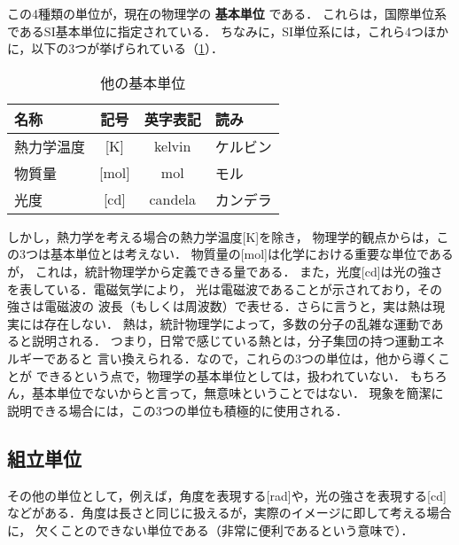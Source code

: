             この4種類の単位が，現在の物理学の \textbf{基本単位} である．
            これらは，国際単位系であるSI基本単位に指定されている．
            ちなみに，SI単位系には，これら4つほかに，以下の3つが挙げられている（\Table\ref{table:o4unit}）．
                \begin{table}[htb]
                  \centering
                  \caption{他の基本単位}
                  \begin{tabular}{|l|c|c|l|}                      \hline
                    名称       & 記号   & 英字表記 & 読み      \\ \hline \hline
                    熱力学温度 & [K]    & kelvin   & ケルビン  \\ \hline
                    物質量     & [mol]  & mol      & モル      \\ \hline
                    光度       & [cd]   & candela  & カンデラ  \\ \hline
                  \end{tabular}
                  \label{table:o4unit}
                \end{table}

            しかし，熱力学を考える場合の熱力学温度[K]を除き，
            物理学的観点からは，この3つは基本単位とは考えない．
            物質量の[mol]は化学における重要な単位であるが，
            これは，統計物理学から定義できる量である．
            また，光度[cd]は光の強さを表している．電磁気学により，
            光は電磁波であることが示されており，その強さは電磁波の
            波長（もしくは周波数）で表せる．さらに言うと，実は熱は現実には存在しない．
            熱は，統計物理学によって，多数の分子の乱雑な運動であると説明される．
            つまり，日常で感じている熱とは，分子集団の持つ運動エネルギーであると
            言い換えられる．なので，これらの3つの単位は，他から導くことが
            できるという点で，物理学の基本単位としては，扱われていない．
            もちろん，基本単位でないからと言って，無意味ということではない．
            現象を簡潔に説明できる場合には，この3つの単位も積極的に使用される．

        \subsection{組立単位}
                その他の単位として，例えば，角度を表現する[rad]や，光の強さを表現する[cd]
                などがある．角度は長さと同じに扱えるが，実際のイメージに即して考える場合に，
                欠くことのできない単位である（非常に便利であるという意味で）．

